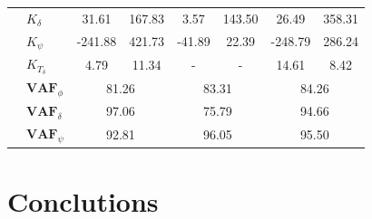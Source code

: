 \begin{table}[]
\begin{tabular}{llcccccc}
                                    & $K_\delta $           & 31.61                                      & 167.83                                             & 3.57                                       & 143.50                                             & 26.49                                      & 358.31                                             \\
                                    & $K_\psi $             & -241.88                                    & 421.73                                             & -41.89                                     & 22.39                                              & -248.79                                    & 286.24                                             \\
                                    & $K_{T_\delta}$        & 4.79                                       & 11.34                                              & -                                          & -                                                  & 14.61                                      & 8.42                                               \\ \cline{2-8} 
                                    & $\mathbf{VAF}_\phi$   & \multicolumn{2}{c}{81.26}                                                                       & \multicolumn{2}{c}{83.31}                                                                       & \multicolumn{2}{c}{84.26}                                                                       \\
                                    & $\mathbf{VAF}_\delta$ & \multicolumn{2}{c}{97.06}                                                                       & \multicolumn{2}{c}{75.79}                                                                       & \multicolumn{2}{c}{94.66}                                                                       \\
                                    & $\mathbf{VAF}_\psi$   & \multicolumn{2}{c}{92.81}                                                                       & \multicolumn{2}{c}{96.05}                                                                       & \multicolumn{2}{c}{95.50}                                                                      
    \end{tabular}
    \label{tb:predict_model}
    \end{table}

\section{Conclutions}

